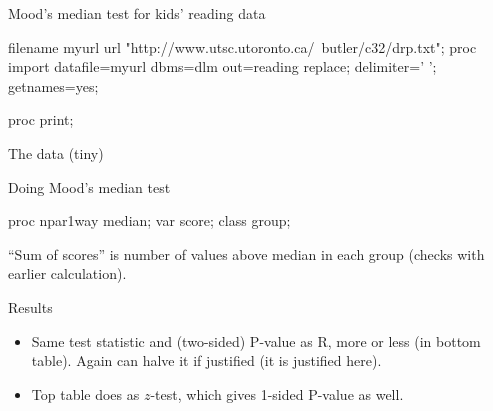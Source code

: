 \documentclass[unknownkeysallowed]{beamer}\usepackage[]{graphicx}\usepackage[]{color}
\begin{document}
\begin{frame}[fragile]{Mood's median test for kids' reading data}
  \begin{Datastep}
filename myurl url 
  "http://www.utsc.utoronto.ca/~butler/c32/drp.txt";    
proc import
  datafile=myurl
  dbms=dlm
  out=reading
  replace;
  delimiter=' ';
  getnames=yes;
\end{Datastep}
\begin{Sascode}[store=iw]
  proc print;
\end{Sascode}

\end{frame}

\begin{frame}[fragile]{The data (tiny)}
  
  
\end{frame}

\begin{frame}[fragile]{Doing Mood's median test}
  
  \begin{Sascode}[store=iv]
proc npar1way median;
  var score;
  class group;
  \end{Sascode}
  
  

    ``Sum of scores'' is number of values above median in each group
    (checks with earlier calculation).

\end{frame}

\begin{frame}[fragile]{Results}

          \begin{itemize}
          \item Same test statistic and (two-sided) P-value as R, more
            or less (in bottom table). Again can halve it if justified
            (it is justified here).
          \item Top table does as $z$-test, which gives 1-sided
            P-value as well.
          \end{itemize}


\end{frame}


%
%  
%  
\end{document}
